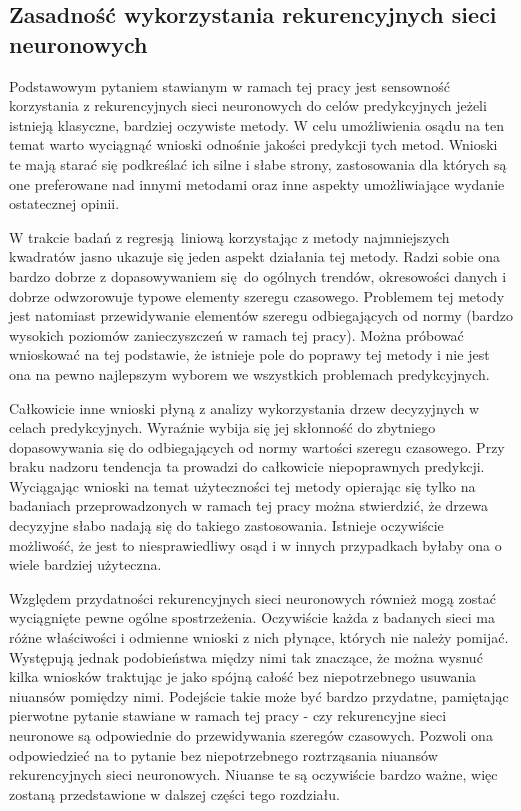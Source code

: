 \documentclass[10pt,a4paper]{article}
\begin{document}
\subsection{Zasadność wykorzystania rekurencyjnych sieci neuronowych}
Podstawowym pytaniem stawianym w ramach tej pracy jest sensowność korzystania z rekurencyjnych sieci neuronowych do celów predykcyjnych jeżeli istnieją klasyczne, bardziej oczywiste metody. W celu umożliwienia osądu na ten temat warto wyciągnąć wnioski odnośnie jakości predykcji tych metod. Wnioski te mają starać się podkreślać ich silne i słabe strony, zastosowania dla których są one preferowane nad innymi metodami oraz inne aspekty umożliwiające wydanie ostatecznej opinii.

W trakcie badań z regresją liniową korzystając z metody najmniejszych kwadratów jasno ukazuje się jeden aspekt działania tej metody. Radzi sobie ona bardzo dobrze z dopasowywaniem się do ogólnych trendów, okresowości danych i dobrze odwzorowuje typowe elementy szeregu czasowego. Problemem tej metody jest natomiast przewidywanie elementów szeregu odbiegających od normy (bardzo wysokich poziomów zanieczyszczeń w ramach tej pracy). Można próbować wnioskować na tej podstawie, że istnieje pole do poprawy tej metody i nie jest ona na pewno najlepszym wyborem we wszystkich problemach predykcyjnych. 

Całkowicie inne wnioski płyną z analizy wykorzystania drzew decyzyjnych w celach predykcyjnych. Wyraźnie wybija się jej skłonność do zbytniego dopasowywania się do odbiegających od normy wartości szeregu czasowego. Przy braku nadzoru tendencja ta prowadzi do całkowicie niepoprawnych predykcji. Wyciągając wnioski na temat użyteczności tej metody opierając się tylko na badaniach przeprowadzonych w ramach tej pracy można stwierdzić, że drzewa decyzyjne słabo nadają się do takiego zastosowania. Istnieje oczywiście możliwość, że jest to niesprawiedliwy osąd i w innych przypadkach byłaby ona o wiele bardziej użyteczna.

Względem przydatności rekurencyjnych sieci neuronowych również mogą zostać wyciągnięte pewne ogólne spostrzeżenia. Oczywiście każda z badanych sieci ma różne właściwości i odmienne wnioski z nich płynące, których nie należy pomijać. Występują jednak podobieństwa między nimi tak znaczące, że można wysnuć kilka wniosków traktując je jako spójną całość bez niepotrzebnego usuwania niuansów pomiędzy nimi. Podejście takie może być bardzo przydatne, pamiętając pierwotne pytanie stawiane w ramach tej pracy - czy rekurencyjne sieci neuronowe są odpowiednie do przewidywania szeregów czasowych. Pozwoli ona odpowiedzieć na to pytanie bez niepotrzebnego roztrząsania niuansów rekurencyjnych sieci neuronowych. Niuanse te są oczywiście bardzo ważne, więc zostaną przedstawione w dalszej części tego rozdziału.
\end{document}
